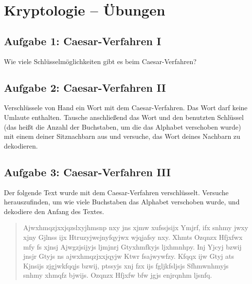 \clearpage

\rehead[]{\textcolor{lightblue}{AvHG, Inf, My}}
\lohead[]{\textcolor{lightblue}{AvHG, Inf, My}}

\section{Kryptologie -- Übungen}

\subsection{Aufgabe 1: Caesar-Verfahren I}

Wie viele Schlüsselmöglichkeiten gibt es beim Caesar-Verfahren?


\subsection{Aufgabe 2: Caesar-Verfahren II}

Verschlüssele von Hand ein Wort mit dem Caesar-Verfahren. Das Wort darf keine
Umlaute enthalten. Tausche anschließend das Wort und den benutzten Schlüssel
(das heißt die Anzahl der Buchstaben, um die das Alphabet verschoben wurde) mit
einem deiner Sitznachbarn aus und versuche, das Wort deines Nachbarn zu
dekodieren.


\subsection{Aufgabe 3: Caesar-Verfahren III}

Der folgende Text wurde mit dem Caesar-Verfahren verschlüsselt. Versuche
herauszufinden, um wie viele Buchstaben das Alphabet verschoben wurde, und
dekodiere den Anfang des Textes.

\begin{quotation}
\noindent
Ajwxhmqzjxxjqzslxyjhmsnp nxy jns xjmw xufssjsijx Ymjrf, ifx snhmy jwxy xjny
Gjlnss ijx Htruzyjwejnyfqyjwx wjqjafsy nxy. Xhmts Ozqnzx Hfjxfwx mfy fs xjnsj
Ajwgzjsijyjs ljmjnrj Gtyxhmfkyjs ljxhmnhpy. Inj Yjcyj bzwij jnsjr Gtyjs ns
ajwxhmqzjxxjqyjw Ktwr fsajwywfzy. Kfqqx ijw Gtyj ats Kjnsijs zjgjwkfqqjs bzwij,
ptssyjs xnj fzx ijs fgljkfsljsjs Sfhmwnhmyjs snhmy xhmqfz bjwijs. Ozqnzx Hfjxfw
bfw jgjs enjrqnhm ljsnfq.
\end{quotation}


